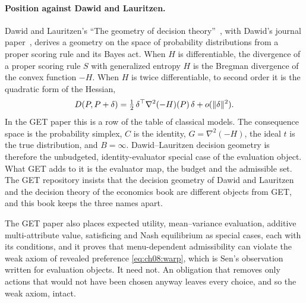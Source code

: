 \paragraph{Position against Dawid and Lauritzen.} Dawid and Lauritzen's ``The geometry of decision theory''~\cite{dawid2005}, with Dawid's journal paper~\cite{dawid2007}, derives a geometry on the space of probability distributions from a proper scoring rule and its Bayes act. When $H$ is differentiable, the divergence of a proper scoring rule $S$ with generalized entropy $H$ is the Bregman divergence of the convex function $-H$. When $H$ is twice differentiable, to second order it is the quadratic form of the Hessian,
\begin{equation}\label{eq:ch08:dl}
D(P,P+\delta)=\tfrac12\,\delta^{\top}\nabla^2(-H)(P)\,\delta+o(\lVert \delta\rVert^2).
\end{equation}
In the GET paper this is a row of the table of classical models. The consequence space is the probability simplex, $C$ is the identity, $G=\nabla^2(-H)$, the ideal $t$ is the true distribution, and $B=\infty$. Dawid--Lauritzen decision geometry is therefore the unbudgeted, identity-evaluator special case of the evaluation object. What GET adds to it is the evaluator map, the budget and the admissible set. The GET repository insists that the decision geometry of Dawid and Lauritzen and the decision theory of the economics book are different objects from GET, and this book keeps the three names apart.


The GET paper also places expected utility, mean--variance evaluation, additive multi-attribute value, satisficing and Nash equilibrium as special cases, each with its conditions, and it proves that menu-dependent admissibility can violate the weak axiom of revealed preference \eqref{eq:ch08:warp}, which is Sen's observation~\cite{sen1971} written for evaluation objects. It need not. An obligation that removes only actions that would not have been chosen anyway leaves every choice, and so the weak axiom, intact.

